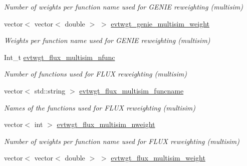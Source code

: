 \begin{DoxyCompactItemize}
\begin{DoxyCompactList}\small\item\em Number of weights per function name used for G\-E\-N\-I\-E reweighting (multisim) \end{DoxyCompactList}\item 
\hypertarget{classUBXSecEvent_a61918cf3a435989606553867c7ade9ae}{vector$<$ vector$<$ double $>$ $>$ \hyperlink{classUBXSecEvent_a61918cf3a435989606553867c7ade9ae}{evtwgt\-\_\-genie\-\_\-multisim\-\_\-weight}}\label{classUBXSecEvent_a61918cf3a435989606553867c7ade9ae}

\begin{DoxyCompactList}\small\item\em Weights per function name used for G\-E\-N\-I\-E reweighting (multisim) \end{DoxyCompactList}\item 
\hypertarget{classUBXSecEvent_abcfe89b2434fdd4bf0f6a355daf5ec25}{Int\-\_\-t \hyperlink{classUBXSecEvent_abcfe89b2434fdd4bf0f6a355daf5ec25}{evtwgt\-\_\-flux\-\_\-multisim\-\_\-nfunc}}\label{classUBXSecEvent_abcfe89b2434fdd4bf0f6a355daf5ec25}

\begin{DoxyCompactList}\small\item\em Number of functions used for F\-L\-U\-X reweighting (multisim) \end{DoxyCompactList}\item 
\hypertarget{classUBXSecEvent_a0db02848f5839fd1d18a8190546d0e4b}{vector$<$ std\-::string $>$ \hyperlink{classUBXSecEvent_a0db02848f5839fd1d18a8190546d0e4b}{evtwgt\-\_\-flux\-\_\-multisim\-\_\-funcname}}\label{classUBXSecEvent_a0db02848f5839fd1d18a8190546d0e4b}

\begin{DoxyCompactList}\small\item\em Names of the functions used for F\-L\-U\-X reweighting (multisim) \end{DoxyCompactList}\item 
\hypertarget{classUBXSecEvent_af868d81fdf37d21fa8a2731a0b5bc1b8}{vector$<$ int $>$ \hyperlink{classUBXSecEvent_af868d81fdf37d21fa8a2731a0b5bc1b8}{evtwgt\-\_\-flux\-\_\-multisim\-\_\-nweight}}\label{classUBXSecEvent_af868d81fdf37d21fa8a2731a0b5bc1b8}

\begin{DoxyCompactList}\small\item\em Number of weights per function name used for F\-L\-U\-X reweighting (multisim) \end{DoxyCompactList}\item 
\hypertarget{classUBXSecEvent_a54a709ff8e83a3c51ef37bba7f4bcf36}{vector$<$ vector$<$ double $>$ $>$ \hyperlink{classUBXSecEvent_a54a709ff8e83a3c51ef37bba7f4bcf36}{evtwgt\-\_\-flux\-\_\-multisim\-\_\-weight}}\label{classUBXSecEvent_a54a709ff8e83a3c51ef37bba7f4bcf36}


\end{DoxyCompactItemize}
